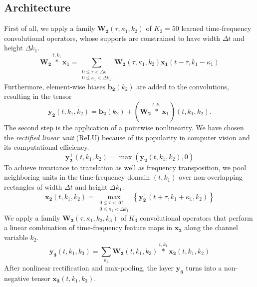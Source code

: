 \documentclass{article}
\begin{document}
\subsection{Architecture}
First of all, we apply a family $\boldsymbol{W_2}(\tau,\kappa_1,k_2)$ of $K_2=50$ learned time-frequency convolutional operators, whose supports are constrained to have width $\Delta t$ and height $\Delta k_1$. 
\begin{equation}
\boldsymbol{W_2}
\overset{t,k_1}{\ast}
\boldsymbol{x_1}
=
\! \!
\sum_{\substack{
0 \leq \tau < \Delta t \\
0 \leq \kappa_1 < \Delta k_1}}
\! \! \! \! \!
\boldsymbol{W_2}(\tau,\kappa_1,k_2)
\boldsymbol{x_1}(t-\tau,k_1-\kappa_1)
\end{equation}
Furthermore, element-wise biases $\boldsymbol{b_2}(k_2)$ are added to the convolutions, resulting in the tensor 
\begin{equation}
\boldsymbol{y_2}(t,k_1,k_2) =
\boldsymbol{b_2}(k_2) + 
(\boldsymbol{W_2}
\overset{t,k_1}{\ast}
\boldsymbol{x_1})(t,k_1,k_2).
\end{equation}
The second step is the application of a pointwise nonlinearity. We have chosen the \emph{rectified linear unit} (ReLU) because of its popularity in computer vision and its computational efficiency.
 \begin{equation}
 \boldsymbol{y_{2}^{+}}(t,k_1,k_2) = \max \left( \boldsymbol{y_2}(t,k_1,k_2), 0\right)
 \end{equation}
 To achieve invariance to translation as well as frequency transposition, we pool neighboring units in
 the time-frequency domain $(t,k_1)$ over non-overlapping rectangles of width $\Delta t$ and height $\Delta k_1$.
 \begin{equation}
 \boldsymbol{x_2}(t,k_1,k_2) = \! \!
 \max_{
\substack{
0 \leq \tau < \Delta t \\
0 \leq \kappa_1 < \Delta k_1}
 } \! \!
\left\{
 \boldsymbol{y_{2}^{+}}(t + \tau, k_1 + \kappa_1, k_2)
 \right\}
 \end{equation}
 We apply a family $\boldsymbol{W_3}(\tau, \kappa_1, k_2, k_3)$ of $K_3$ convolutional operators that perform a linear combination of time-frequency feature maps in $\boldsymbol{x_2}$ along the channel variable $k_2$.
 \begin{equation}
 \boldsymbol{y_3}(t,k_1,k_3) =
 \sum_{k_2}
 \boldsymbol{W_3}(t,k_1,k_3)
 \overset{t,k_1}{\ast}
 \boldsymbol{x_2}(t,k_1,k_2)
 \end{equation}
After nonlinear rectification and max-pooling, the layer $\boldsymbol{y_3}$ turns into a non-negative tensor $\boldsymbol{x_3}(t,k_1,k_3)$.
\end{document}
